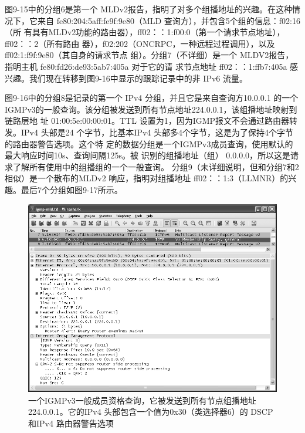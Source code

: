 图9-15中的分组6是第一个 MLDv2报告，指明了对多个组播地址的兴趣。在这种情
况下，它来自 fe80:204:5aff:fe9f:9e80（MLD 查询方），并包含5个组的信息：f02:16（所
有具有MLDv2功能的路由器），ff02：：1:f00:0（第一个请求节点地址），ff02：：2（所有路由
器），f02:202（ONCRPC，一种远程过程调用），以及 ff02:1:f9f:9e80（其自身的请求节点
组）。分组7（不详细）是一个 MLDV2报告，指明主机 fe80:fd26:de93:5ab7:405a 对于它的请
求节点地址 ff02：：1:ffb7:405a 感兴趣。我们现在转移到图9-16中显示的跟踪记录中的非 IPv6
流量。

图9-16中的分组8是记录的第一个 IPv4 分组，并且它是来自查询方10.0.0.1 的一个
IGMPv3的一般查询。该分组被发送到所有节点地址224.0.0.1，该组播地址映射到链路层地
址 01:00:5e:00:00:01。TTL 设置为1，因为IGMP报文不会通过路由器转发。IPv4 头部是24
个字节，比基本IPv4 头部多4个字节，这是为了保持4个字节的路由器警告选项。这个特
定的数据分组是一个IGMPv3成员查询，使用默认的最大响应时间10s、查询间隔125s。被
识别的组播地址（组） 0.0.0.0，所以这是请求了解所有使用中的组播组的一个一般查询。
分组9（未详细说明，但和分组7和2相似）是一个散布的MLDv2 响应，指明对组播地址
ff02：：1:3（LLMNR）的兴趣。最后7个分组如图9-17所示。
\begin{figure}[ht]
  \centering
  \includegraphics[width=1.0\textwidth]{imgs/9/9-16.png}
  \caption{一个IGMPv3一般成员资格查询，它被发送到所有节点组播地址 224.0.0.1。它的IPv4
  头部包含一个值为0x30（类选择器6）的 DSCP 和IPv4 路由器警告选项}
\end{figure}

